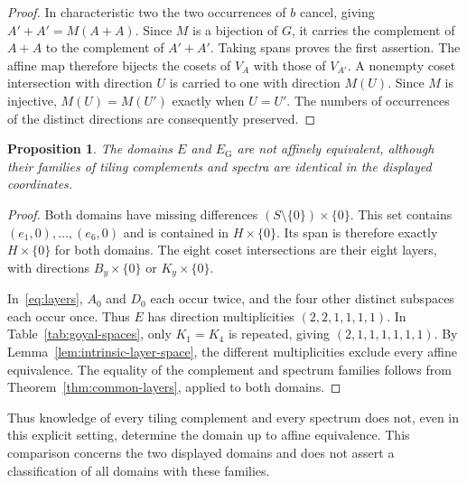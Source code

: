 \documentclass[11pt]{article}
\numberwithin{equation}{section}
\newtheorem{proposition}[theorem]{Proposition}
\theoremstyle{definition}
\theoremstyle{remark}\newtheorem{remark}[theorem]{Remark}
\begin{document}
\begin{proof}
In characteristic two the two occurrences of $b$ cancel, giving
$A'+A'=M(A+A)$. Since $M$ is a bijection of $G$, it carries the
complement of $A+A$ to the complement of $A'+A'$. Taking spans proves
the first assertion. The affine map therefore bijects the cosets of
$V_A$ with those of $V_{A'}$. A nonempty coset intersection with direction
$U$ is carried to one with direction $M(U)$. Since $M$ is injective,
$M(U)=M(U')$ exactly when $U=U'$. The numbers of occurrences of the
distinct directions are consequently preserved.
\end{proof}

\begin{proposition}\label{prop:inequivalence}
The domains $E$ and $E_{\mathrm G}$ are not affinely equivalent,
although their families of tiling complements and spectra are identical
in the displayed coordinates.
\end{proposition}
\begin{proof}
Both domains have missing differences
$(S\setminus\{0\})\times\{0\}$. This set contains
$(e_1,0),\ldots,(e_6,0)$ and is contained in $H\times\{0\}$.
Its span is therefore exactly $H\times\{0\}$ for both domains.
The eight coset intersections are their eight layers, with directions
$B_y\times\{0\}$ or $K_y\times\{0\}$.

In~\eqref{eq:layers}, $A_0$ and $D_0$ each occur twice, and the four
other distinct subspaces each occur once. Thus $E$ has direction
multiplicities $(2,2,1,1,1,1)$. In Table~\ref{tab:goyal-spaces}, only
$K_1=K_4$ is repeated, giving $(2,1,1,1,1,1,1)$. By
Lemma~\ref{lem:intrinsic-layer-space}, the different multiplicities
exclude every affine equivalence. The equality of the complement and
spectrum families follows from Theorem~\ref{thm:common-layers}, applied
to both domains.
\end{proof}

Thus knowledge of every tiling complement and every spectrum does not,
even in this explicit setting, determine the domain up to affine
equivalence. This comparison concerns the two displayed domains and
does not assert a classification of all domains with these families.
\end{document}

